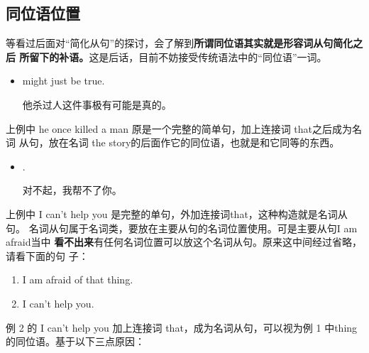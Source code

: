 \subsection{同位语位置}

等看过后面对“简化从句”的探讨，会了解到\textbf{所谓同位语其实就是形容词从句简化之后
所留下的补语。}这是后话，目前不妨接受传统语法中的“同位语”一词。

\begin{itemize}
\item {}  might just
  be true.

  他杀过人这件事极有可能是真的。
\end{itemize}
上例中 he once killed a man 原是一个完整的简单句，加上连接词 that之后成为名词
从句，放在名词 the story的后面作它的同位语，也就是和它同等的东西。

\begin{itemize}
\item {}   .

  对不起，我帮不了你。
\end{itemize}
上例中 I can't help you 是完整的单句，外加连接词that，这种构造就是名词从句。
名词从句属于名词类，要放在主要从句的名词位置使用。可是主要从句I am afraid当中
\textbf{看不出来}有任何名词位置可以放这个名词从句。原来这中间经过省略，请看下面的句
子：
\begin{enumerate}
\item I am afraid of that thing.
\item I can't help you.
\end{enumerate}
例 2 的 I can't help you 加上连接词 that，成为名词从句，可以视为例 1 中thing
的同位语。基于以下三点原因：

